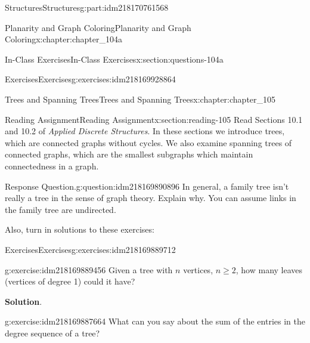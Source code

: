 \documentclass[oneside,10pt,]{book}
\newcommand{\blocktitlefont}{\relax}
\numberwithin{equation}{section}
\begin{document}
\begin{partptx}{Structures}{}{Structures}{}{}{g:part:idm218170761568}
\begin{chapterptx}{Planarity and Graph Coloring}{}{Planarity and Graph Coloring}{}{}{x:chapter:chapter_104a}
\begin{sectionptx}{In-Class Exercises}{}{In-Class Exercises}{}{}{x:section:questions-104a}
\begin{exercises-subsection-numberless}{Exercises}{}{Exercises}{}{}{g:exercises:idm218169928864}
\begin{exercisegroup}
\end{exercisegroup}
\par\medskip\noindent
\end{exercises-subsection-numberless}
\end{sectionptx}
\end{chapterptx}
%
\typeout{************************************************}
\typeout{************************************************}
%
\begin{chapterptx}{Trees and Spanning Trees}{}{Trees and Spanning Trees}{}{}{x:chapter:chapter_105}
\index{}%
%
%
\typeout{************************************************}
\typeout{************************************************}
%
\begin{sectionptx}{Reading Assignment}{}{Reading Assignment}{}{}{x:section:reading-105}
Read Sections 10.1 and 10.2 of \emph{Applied Discrete Structures}. In these sections we introduce trees, which are connected graphs without cycles.  We also examine spanning trees of connected graphs, which are the smallest subgraphs which maintain connectedness in a graph.%
\begin{question}{Response Question.}{g:question:idm218169890896}%
In general, a family tree isn't really a tree in the sense of graph theory. Explain why.  You can assume links in the family tree are undirected.%
\end{question}
Also, turn in solutions to these exercises:%
%
%
\typeout{************************************************}
\typeout{************************************************}
%
\begin{exercises-subsection-numberless}{Exercises}{}{Exercises}{}{}{g:exercises:idm218169889712}
\par\medskip\noindent%
%
\begin{exercisegroup}
\begin{divisionexerciseeg}{1}{}{}{g:exercise:idm218169889456}%
Given a tree with \(n\) vertices, \(n \geq 2\), how many leaves (vertices of degree 1) could it have?%
\par\smallskip%
\noindent\textbf{\blocktitlefont Solution}.\hypertarget{g:solution:idm218169887920}{}\quad{}%
\end{divisionexerciseeg}%
\begin{divisionexerciseeg}{2}{}{}{g:exercise:idm218169887664}%
What can you say about the sum of the entries in the degree sequence of a tree?%
\par\smallskip%

\end{divisionexerciseeg}
\end{exercisegroup}
\end{exercises-subsection-numberless}
\end{sectionptx}
\end{chapterptx}
\end{partptx}
\end{document}

